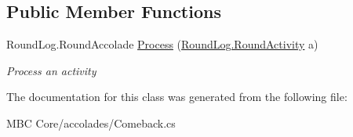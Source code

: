 \subsection*{Public Member Functions}
\begin{DoxyCompactItemize}
\item 
\hypertarget{class_m_b_c_1_1_core_1_1mbc_1_1accolades_1_1_comeback_aa0df9875de35d9a73af4cde1f46c3c3b}{Round\-Log.\-Round\-Accolade \hyperlink{class_m_b_c_1_1_core_1_1mbc_1_1accolades_1_1_comeback_aa0df9875de35d9a73af4cde1f46c3c3b}{Process} (\hyperlink{class_m_b_c_1_1_core_1_1_round_log_1_1_round_activity}{Round\-Log.\-Round\-Activity} a)}\label{class_m_b_c_1_1_core_1_1mbc_1_1accolades_1_1_comeback_aa0df9875de35d9a73af4cde1f46c3c3b}

\begin{DoxyCompactList}\small\item\em Process an activity\end{DoxyCompactList}\end{DoxyCompactItemize}


The documentation for this class was generated from the following file\-:\begin{DoxyCompactItemize}
\item 
M\-B\-C Core/accolades/Comeback.\-cs\end{DoxyCompactItemize}
